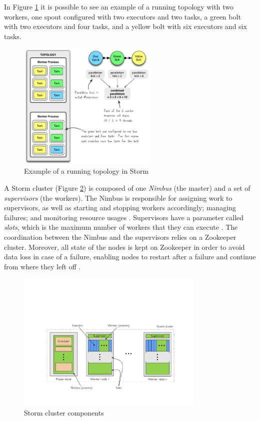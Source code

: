 \documentclass[ppgc,diss,english]{iiufrgs}
\begin{document}
In Figure \ref{fig:storm_running_topology} it is possible to see an example of a running topology with two workers, one spout configured with two executors and two tasks, a green bolt with two executors and four tasks, and a yellow bolt with six executors and six tasks.

\begin{figure}[!ht]
	\centering
	\includegraphics[width=0.6\textwidth]{images/storm/example-of-a-running-topology.png}
	\caption[Example of a running topology in Storm]{Example of a running topology in Storm \cite{storm2015docs}}
	\label{fig:storm_running_topology}
\end{figure}

A Storm cluster (Figure \ref{fig:storm_cluster}) is composed of one \emph{Nimbus} (the master) and a set of \emph{supervisors} (the workers). The Nimbus is responsible for assigning work to supervisors, as well as starting and stopping workers accordingly; managing failures; and monitoring resource usages \cite{heinze2014cloud}. Supervisors have a parameter called \emph{slots}, which is the maximum number of workers that they can execute \cite{aniello2013adaptive}. The coordination between the Nimbus and the supervisors relies on a Zookeeper cluster. Moreover, all state of the nodes is kept on Zookeeper in order to avoid data loss in case of a failure, enabling nodes to restart after a failure and continue from where they left off \cite{storm2015docs}.

\begin{figure}[!ht]
	\centering
	\includegraphics[width=0.8\textwidth]{images/storm/cluster.pdf}
	\caption[Storm cluster components]{Storm cluster components \cite{heinze2014cloud}}
	\label{fig:storm_cluster}
\end{figure}
\end{document}
